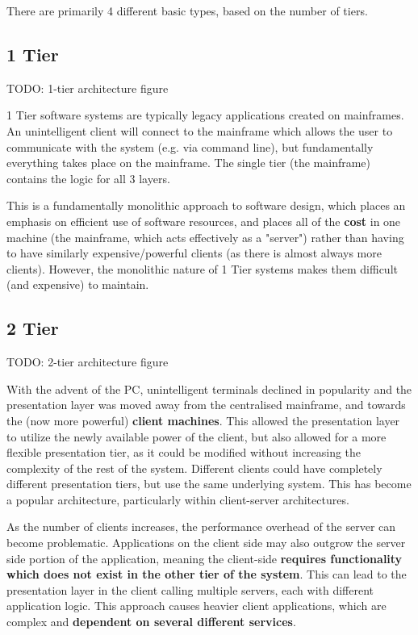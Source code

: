 \documentclass{article}
\begin{document}
There are primarily 4 different basic types, based on the number of tiers. 

\subsection{1 Tier}

TODO: 1-tier architecture figure

1 Tier software systems are typically legacy applications created on mainframes. An unintelligent client will connect to the mainframe which allows the user to communicate with the system (e.g. via command line), but fundamentally everything takes place on the mainframe. The single tier (the mainframe) contains the logic for all 3 layers. 

This is a fundamentally monolithic approach to software design, which places an emphasis on efficient use of software resources, and places all of the \textbf{cost} in one machine (the mainframe, which acts effectively as a "server") rather than having to have similarly expensive/powerful clients (as there is almost always more clients). However, the monolithic nature of 1 Tier systems makes them difficult (and expensive) to maintain.

\subsection{2 Tier}

TODO: 2-tier architecture figure

With the advent of the PC, unintelligent terminals declined in popularity and the presentation layer was moved away from the centralised mainframe, and towards the (now more powerful) \textbf{client machines}. This allowed the presentation layer to utilize the newly available power of the client, but also allowed for a more flexible presentation tier, as it could be modified without increasing the complexity of the rest of the system. Different clients could have completely different presentation tiers, but use the same underlying system. This has become a popular architecture, particularly within client-server architectures. 

As the number of clients increases, the performance overhead of the server can become problematic. Applications on the client side may also outgrow the server side portion of the application, meaning the client-side \textbf{requires functionality which does not exist in the other tier of the system}. This can lead to the presentation layer in the client calling multiple servers, each with different application logic. This approach causes heavier client applications, which are complex and \textbf{dependent on several different services}.
\end{document}
